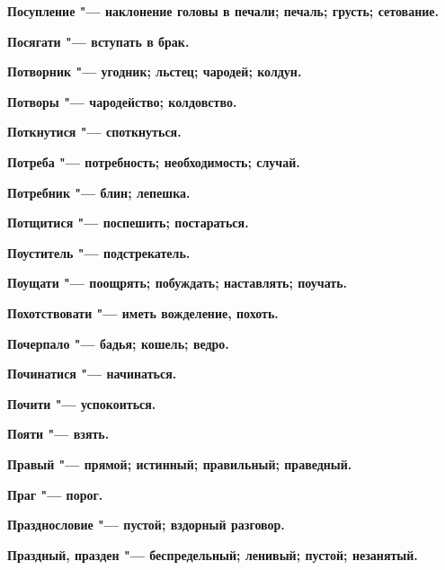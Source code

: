 \begin{mymulticols}{2}
\bfseries Посупление\normalfont{} "--- наклонение головы в печали; печаль; грусть; сетование. 




\bfseries Посягати\normalfont{} "--- вступать в брак. 




\bfseries Потворник\normalfont{} "--- угодник; льстец; чародей; колдун. 




\bfseries Потворы\normalfont{} "--- чародейство; колдовство. 




\bfseries Поткнутися\normalfont{} "--- споткнуться. 




\bfseries Потреба\normalfont{} "--- потребность; необходимость; случай. 




\bfseries Потребник\normalfont{} "--- блин; лепешка. 




\bfseries Потщитися\normalfont{} "--- поспешить; постараться. 




\bfseries Поуститель\normalfont{} "--- подстрекатель. 




\bfseries Поущати\normalfont{} "--- поощрять; побуждать; наставлять; поучать. 




\bfseries Похотствовати\normalfont{} "--- иметь вожделение, похоть. 




\bfseries Почерпало\normalfont{} "--- бадья; кошель; ведро. 




\bfseries Починатися\normalfont{} "--- начинаться. 




\bfseries Почити\normalfont{} "--- успокоиться. 




\bfseries Пояти\normalfont{} "--- взять. 




\bfseries Правый\normalfont{} "--- прямой; истинный; правильный; праведный. 




\bfseries Праг\normalfont{} "--- порог. 

\bfseries Празднословие\normalfont{} "--- пустой; вздорный разговор. 



\bfseries Праздный, празден\normalfont{} "--- беспредельный; ленивый; пустой; незанятый. 





\end{mymulticols}
